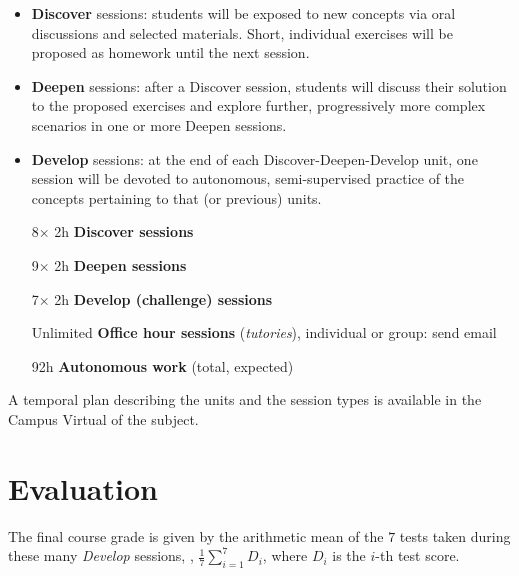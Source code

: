 \begin{itemize}
\item \textbf{Discover} sessions: students will be exposed to new concepts via oral discussions and selected materials.
Short, individual exercises will be proposed as homework until the next session.

\item \textbf{Deepen} sessions: after a Discover session, students will discuss their solution to the proposed exercises
and explore further, progressively more complex scenarios in one or more Deepen sessions.

\item \textbf{Develop} sessions: at the end of each Discover-Deepen-Develop unit, one session will be devoted to autonomous,
semi-supervised practice of the concepts pertaining to that (or previous) units.
\end{itemize}


\begin{center}
\begin{minipage}{0.75\linewidth}
\begin{itemize}
 \item[8$\times$] 2h {\color{color1}\textbf{Discover sessions}}
 \item[9$\times$] 2h {\color{color2}\textbf{Deepen sessions}}
 \item[7$\times$] 2h {\color{color3}\textbf{Develop (challenge) sessions}}
 \item[Unlimited] \textbf{\color{darkgray}Office hour sessions} (\textit{tutories}), individual or group: send email
 \item[92h] {\textbf{\color{gray}Autonomous work} (total, expected)}
\end{itemize}
\end{minipage}
\end{center}
A temporal plan describing the units and the session types is available in the Campus Virtual of the subject.

\section*{Evaluation}

The final course grade is given by the arithmetic mean of the $7$ tests taken during these many \textit{Develop} sessions, \ie,
%
$ \frac{1}{7} \sum_{i=1}^7 D_i$,
%
where $D_i$ is the $i$-th test score.

